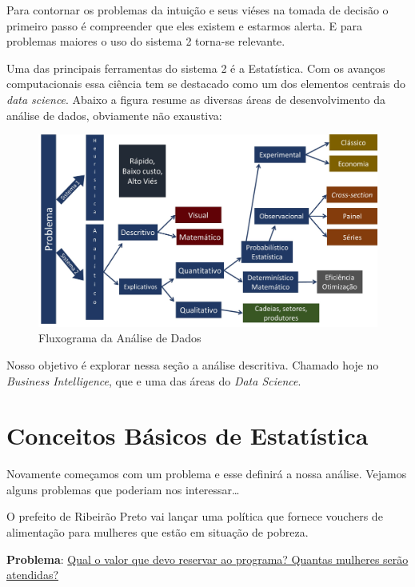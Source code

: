 \documentclass[
  letterpaper,
  DIV=11,
  numbers=noendperiod]{scrreprt}
\begin{document}
Para contornar os problemas da intuição e seus viéses na tomada de
decisão o primeiro passo é compreender que eles existem e estarmos
alerta. E para problemas maiores o uso do sistema 2 torna-se relevante.

Uma das principais ferramentas do sistema 2 é a Estatística. Com os
avanços computacionais essa ciência tem se destacado como um dos
elementos centrais do \emph{data science}. Abaixo a figura resume as
diversas áreas de desenvolvimento da análise de dados, obviamente não
exaustiva:

\begin{figure}[H]

{\centering \includegraphics[width=0.8\linewidth,height=\textheight,keepaspectratio]{figuras/analisedados.jpg}

}

\caption{Fluxograma da Análise de Dados}

\end{figure}%

Nosso objetivo é explorar nessa seção a análise descritiva. Chamado hoje
no \emph{Business Intelligence}, que e uma das áreas do \emph{Data
Science}.

\section{Conceitos Básicos de
Estatística}\label{conceitos-buxe1sicos-de-estatuxedstica}

Novamente começamos com um problema e esse definirá a nossa análise.
Vejamos alguns problemas que poderiam nos interessar\ldots{}

\begin{tcolorbox}[enhanced jigsaw, titlerule=0mm, colback=white, coltitle=black, opacityback=0, breakable, colbacktitle=quarto-callout-note-color!10!white, toprule=.15mm, colframe=quarto-callout-note-color-frame, toptitle=1mm, bottomtitle=1mm, opacitybacktitle=0.6, left=2mm, arc=.35mm, rightrule=.15mm, bottomrule=.15mm, leftrule=.75mm, title=\textcolor{quarto-callout-note-color}{\faInfo}\hspace{0.5em}{Problema 1}]

O prefeito de Ribeirão Preto vai lançar uma política que fornece
vouchers de alimentação para mulheres que estão em situação de pobreza.

\textbf{Problema}: \ul{Qual o valor que devo reservar ao programa?
Quantas mulheres serão atendidas?}

\end{tcolorbox}
\end{document}
